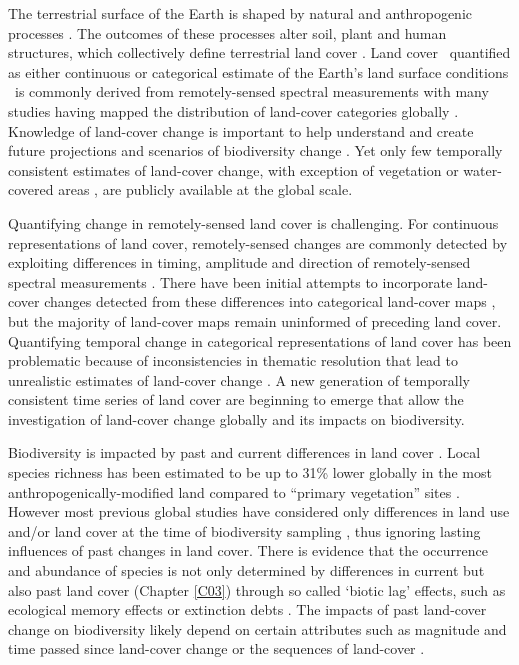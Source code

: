 The terrestrial surface of the Earth is shaped by natural and anthropogenic processes \citep{Foley2005}. The outcomes of these processes alter soil, plant and human structures, which collectively define terrestrial land cover \citep{DiGregorio2000,Lambin2006}. Land cover \textendash\ quantified as either continuous or categorical estimate of the Earth's land surface conditions \textendash\ is commonly derived from remotely-sensed spectral measurements with many studies having mapped the distribution of land-cover categories globally \citep{DeFries1994,Hansen2000,Tuanmu2014,Grekousis2015}. Knowledge of land-cover change is important to help understand and create future projections and scenarios of biodiversity change \citep{Harfoot2014,Titeux2016,Kehoe2017a}. Yet only few temporally consistent estimates of land-cover change, with exception of vegetation \citep{Hansen2013,Song2018} or water-covered areas \citep{Pekel2016}, are publicly available at the global scale. 

Quantifying change in remotely-sensed land cover is challenging. For continuous representations of land cover, remotely-sensed changes are commonly detected by exploiting differences in timing, amplitude and direction of remotely-sensed spectral measurements \citep{Coppin2004,Lhermitte2011,Zhu2017}. There have been initial attempts to incorporate land-cover changes detected from these differences into categorical land-cover maps \citep{Zhu2014,Hermosilla2018}, but the majority of land-cover maps remain uninformed of preceding land cover. Quantifying temporal change in categorical representations of land cover has been problematic because of inconsistencies in thematic resolution that lead to unrealistic estimates of land-cover change \citep{VERBURG2011,Cardille2016,Abercrombie2016}. A new generation of temporally consistent time series of land cover \citep{ESA2017,Hermosilla2018,Nowosad2018,Sulla-Menashe2019} are beginning to emerge that allow the investigation of land-cover change globally and its impacts on biodiversity.

Biodiversity is impacted by past and current differences in land cover \citep{Newbold2015,Newbold2016a,Jung2018}. Local species richness has been estimated to be up to 31\% lower globally in the most anthropogenically-modified land compared to “primary vegetation” sites \citep{Newbold2015}. However most previous global studies have considered only differences in land use and/or land cover at the time of biodiversity sampling \citep{Gibson2011,Murphy2014,Newbold2015}, thus ignoring lasting influences of past changes in land cover. There is evidence that the occurrence and abundance of species is not only determined by differences in current but also past land cover (Chapter \ref{C03}) through so called ‘biotic lag’ effects, such as ecological memory effects \citep{Ogle2015} or extinction debts \citep{Kuussaari2009}. The impacts of past land-cover change on biodiversity likely depend on certain attributes such as magnitude and time passed since land-cover change \citep[Chapter \ref{C03}, ][]{Martin2013,Watson2014,Fu2017} or the sequences of land-cover \citep{Watson2014,Nowosad2018}. 

